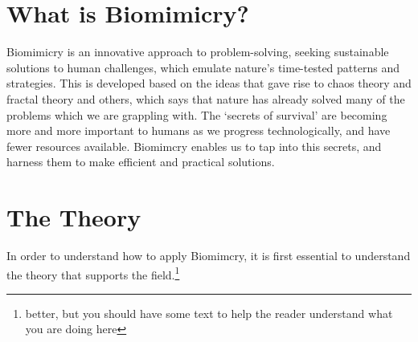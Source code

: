 \section{What is Biomimicry?}

Biomimicry is an innovative approach to problem-solving, seeking sustainable solutions to human challenges, which emulate nature's time-tested patterns and strategies. This is developed based on the ideas that gave rise to chaos theory and fractal theory and others, which says that nature has already solved many of the problems which we are grappling with. The `secrets of survival' are becoming more and more important to humans as we progress technologically, and have fewer resources available. Biomimcry enables us to tap into this secrets, and harness them to make efficient and practical solutions.

\section{The Theory}

In order to understand how to apply Biomimcry, it is first essential to understand the theory that supports the field.\footnote{better, but you should have some text to help the reader understand what you are doing here}

